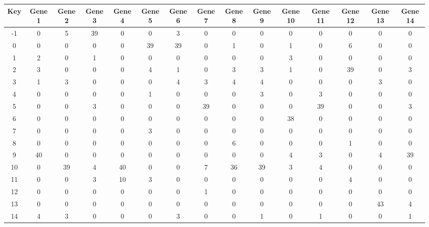 \begin{tabular}{|c|c|c|c|c|c|c|c|c|c|c|c|c|c|c|}
\hline
Key & Gene 1 & Gene 2 & Gene 3 & Gene 4 & Gene 5 & Gene 6 & Gene 7 & Gene 8 & Gene 9 & Gene 10 & Gene 11 & Gene 12 & Gene 13 & Gene 14 \\
\hline
-1 & 0 & 5 & 39 & 0 & 0 & 3 & 0 & 0 & 0 & 0 & 0 & 0 & 0 & 0 \\
0 & 0 & 0 & 0 & 0 & 39 & 39 & 0 & 1 & 0 & 1 & 0 & 6 & 0 & 0 \\
1 & 2 & 0 & 1 & 0 & 0 & 0 & 0 & 0 & 0 & 3 & 0 & 0 & 0 & 0 \\
2 & 3 & 0 & 0 & 0 & 4 & 1 & 0 & 3 & 3 & 1 & 0 & 39 & 0 & 3 \\
3 & 1 & 3 & 0 & 0 & 0 & 4 & 3 & 4 & 4 & 0 & 0 & 0 & 3 & 0 \\
4 & 0 & 0 & 0 & 0 & 1 & 0 & 0 & 0 & 3 & 0 & 3 & 0 & 0 & 0 \\
5 & 0 & 0 & 3 & 0 & 0 & 0 & 39 & 0 & 0 & 0 & 39 & 0 & 0 & 3 \\
6 & 0 & 0 & 0 & 0 & 0 & 0 & 0 & 0 & 0 & 38 & 0 & 0 & 0 & 0 \\
7 & 0 & 0 & 0 & 0 & 3 & 0 & 0 & 0 & 0 & 0 & 0 & 0 & 0 & 0 \\
8 & 0 & 0 & 0 & 0 & 0 & 0 & 0 & 6 & 0 & 0 & 0 & 1 & 0 & 0 \\
9 & 40 & 0 & 0 & 0 & 0 & 0 & 0 & 0 & 0 & 4 & 3 & 0 & 4 & 39 \\
10 & 0 & 39 & 4 & 40 & 0 & 0 & 7 & 36 & 39 & 3 & 4 & 0 & 0 & 0 \\
11 & 0 & 0 & 3 & 10 & 3 & 0 & 0 & 0 & 0 & 0 & 0 & 4 & 0 & 0 \\
12 & 0 & 0 & 0 & 0 & 0 & 0 & 1 & 0 & 0 & 0 & 0 & 0 & 0 & 0 \\
13 & 0 & 0 & 0 & 0 & 0 & 0 & 0 & 0 & 0 & 0 & 0 & 0 & 43 & 4 \\
14 & 4 & 3 & 0 & 0 & 0 & 3 & 0 & 0 & 1 & 0 & 1 & 0 & 0 & 1 \\
\hline
\end{tabular}